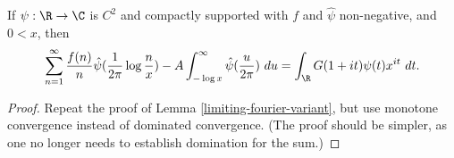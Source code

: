 \begin{lemma}
\label{limiting-fourier-variant}
\leanok
If $\psi: \R \to \C$ is $C^2$ and compactly supported with $f$ and $\hat \psi$ non-negative, and $0 < x$, then
  $$ \sum_{n=1}^\infty \frac{f(n)}{n} \hat \psi( \frac{1}{2\pi} \log \frac{n}{x} ) - A \int_{-\log x}^\infty \hat \psi(\frac{u}{2\pi})\ du =  \int_\R G(1+it) \psi(t) x^{it}\ dt.$$
\end{lemma}
\begin{proof}
\leanok
Repeat the proof of Lemma \ref{limiting-fourier-variant}, but use monotone convergence instead of dominated convergence.  (The proof should be simpler, as one no longer needs to establish domination for the sum.)
\end{proof}
